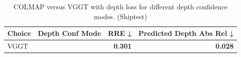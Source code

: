 \begin{table}[H]
\caption{COLMAP versus VGGT with depth loss for different depth confidence modes. (Shiptest)}
\label{tab:05_depth_conf_mode_shiptest}
\begin{tabular}{llrr}
\toprule
Choice & Depth Conf Mode & RRE ↓ & Predicted Depth Abs Rel ↓ \\
\midrule
VGGT &  & \textbf{0.301} & \textbf{0.028} \\
\bottomrule
\end{tabular}
\end{table}
